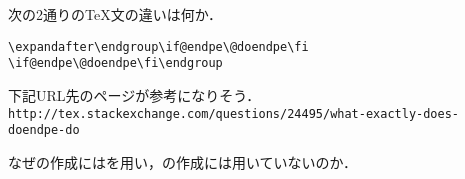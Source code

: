 \documentclass[autodetect-engine,dvipdfmx]{jsarticle}
\begin{document}
\begin{question}
次の2通りの\TeX 文の違いは何か．
\texsource
\begin{lstlisting}
\expandafter\endgroup\if@endpe\@doendpe\fi
\if@endpe\@doendpe\fi\endgroup
\end{lstlisting}
\end{question}
\begin{answer}
下記URL先のページが参考になりそう．\\
\qquad\verb|http://tex.stackexchange.com/questions/24495/what-exactly-does-doendpe-do|
\end{answer}

\begin{question}
なぜの作成にはを用い，の作成には用いていないのか．
\end{question}
\end{document}
